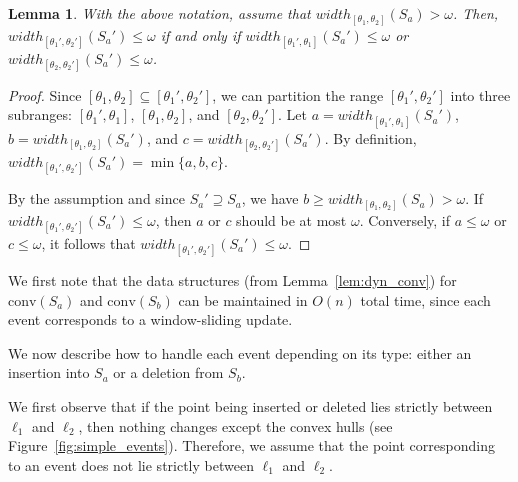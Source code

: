 \documentclass[10pt,a4paper]{article}
\newtheorem{lemma}[theorem]{Lemma}
\theoremstyle{star}
\theoremstyle{claimstar}
\newcommand{\conv}{\ensuremath{\mathrm{conv}}}
\begin{document}
\begin{lemma}
    \label{lem:width_test_obs}
    With the above notation, assume that $width_{[\theta_1, \theta_2]}(S_a) > \omega$. 
Then, \\$width_{[\theta_1', \theta_2']} (S_a') \le \omega$ if and only if 
$width_{[\theta_1' , \theta_1]}(S_a') \le \omega$ or
$width_{[\theta_2, \theta_2']}(S_a') \le \omega$.
\end{lemma}


\begin{proof}
    Since $[\theta_1, \theta_2] \subseteq [\theta_1', \theta_2']$,
    we can partition the range $[\theta_1', \theta_2']$ into three subranges: $[\theta_1', \theta_1]$, $[\theta_1, \theta_2]$, and $[\theta_2, \theta_2']$.
    Let $a = width_{[\theta_1', \theta_1]}(S_a')$, 
    $b = width_{[\theta_1, \theta_2]}(S_a')$, and 
    $c = width_{[\theta_2, \theta_2']}(S_a')$.
    By definition, $width_{[\theta_1', \theta_2']}(S_a') = \min \{a, b, c \}$. 

    By the assumption and since $S_a' \supseteq S_a$, we have $b \ge width_{[\theta_1, \theta_2]}(S_a) > \omega$.
    If $width_{[\theta_1', \theta_2']}(S_a') \allowbreak \le \omega$, then $a$ or $c$ should be at most $\omega$.
    Conversely, if $a \le \omega$ or $c \le \omega$, it follows that $width_{[\theta_1', \theta_2']}(S_a') \le \omega$.
\end{proof}






We first note that the data structures (from Lemma~\ref{lem:dyn_conv}) for $\conv(S_a)$ and $\conv(S_b)$ can be maintained in $O(n)$ total time, since each event corresponds to a window-sliding update.



We now describe how to handle each event depending on its type: either an insertion into $S_a$ or a deletion from $S_b$.

We first observe that if the point being inserted or deleted lies strictly between $\ell_1$ and $\ell_2$, then nothing changes except the convex hulls (see Figure~\ref{fig:simple_events}).
Therefore, we assume that the point corresponding to an event does not lie strictly between $\ell_1$ and $\ell_2$.
\end{document}
